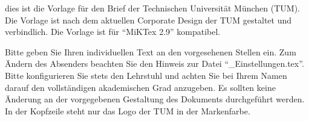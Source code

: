 %
% 
% 
%



\newcommand{\Absender}{%
    \UniversitaetName \\
    \UniversitaetAdresse \\
    2.~Adresszeile erscheint automatisch
}
\newcommand{\EmpfaengerNachname}{Mustermann}
\newcommand{\EmpfaengerAdresse}{%
    Fa. Muster Mechanik\\
    Herrn Max \EmpfaengerNachname\\
    Musterstraße 12\\
    12345 München\\
    ~\\
    Adressfeld mit bis zu 6 Zeilen
}
\newcommand{\Datum}{Datum} %
\newcommand{\Betreff}{Betreffzeile}
\newcommand{\Gruss}{Sehr geehrter Herr \EmpfaengerNachname,}





dies ist die Vorlage für den Brief der Technischen Universität München (TUM).
Die Vorlage ist nach dem aktuellen Corporate Design der TUM gestaltet und
verbindlich. Die Vorlage ist für "`MiKTex 2.9"' kompatibel.

Bitte geben Sie Ihren individuellen Text an den vorgesehenen Stellen ein. Zum
Ändern des Absenders beachten Sie den Hinweis zur Datei
"`\_Einstellungen.tex"'. Bitte konfigurieren Sie stets den Lehrstuhl und
achten Sie bei Ihrem Namen darauf den vollständigen akademischen Grad
anzugeben. Es sollten keine Änderung an der vorgegebenen Gestaltung des
Dokuments durchgeführt werden. In der Kopfzeile steht nur das Logo der TUM in
der Markenfarbe.

